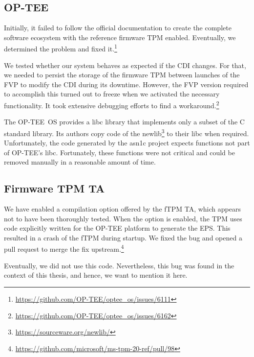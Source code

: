 \subsection{OP-TEE}


Initially, it failed to follow the official documentation to create the complete software ecosystem with the reference firmware TPM enabled.
Eventually, we determined the problem and fixed it.\footnote{\url{https://github.com/OP-TEE/optee_os/issues/6111}}


We tested whether our system behaves as expected if the CDI changes.
For that, we needed to persist the storage of the firmware TPM between launches of the FVP to modify the CDI during its downtime.
However, the FVP version required to accomplish this turned out to freeze when we activated the necessary functionality.
It took extensive debugging efforts to find a workaround.\footnote{\url{https://github.com/OP-TEE/optee_os/issues/6162}}

The OP-TEE~OS provides a libc library that implements only a subset of the C standard library.
Its authors copy code of the newlib\footnote{\url{https://sourceware.org/newlib/}} to their libc when required.
Unfortunately, the code generated by the asn1c project expects functions not part of OP-TEE's libc.
Fortunately, these functions were not critical and could be removed manually in a reasonable amount of time.

\subsection{Firmware TPM TA}

We have enabled a compilation option offered by the fTPM TA, which appears not to have been thoroughly tested.
When the option is enabled, the TPM uses code explicitly written for the OP-TEE platform to generate the EPS\@.
This resulted in a crash of the fTPM during startup.
We fixed the bug and opened a pull request to merge the fix upstream.\footnote{\url{https://github.com/microsoft/ms-tpm-20-ref/pull/98}}

Eventually, we did not use this code.
Nevertheless, this bug was found in the context of this thesis, and hence, we want to mention it here.
